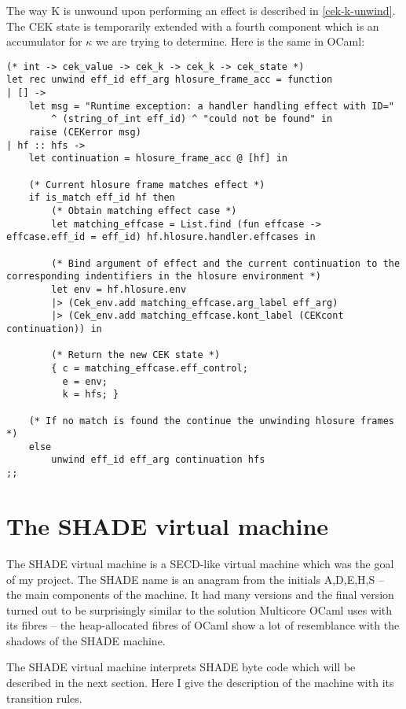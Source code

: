 \documentclass[class=article, crop=false]{standalone}
\begin{document}
The way K is unwound upon performing an effect is described in \autoref{cek-k-unwind}. The CEK state is temporarily extended with a
fourth component which is an accumulator for $\kappa$ we are trying to determine. Here is the same in OCaml:

\begin{lstlisting}[language=caml]
(* int -> cek_value -> cek_k -> cek_k -> cek_state *)
let rec unwind eff_id eff_arg hlosure_frame_acc = function
| [] ->
    let msg = "Runtime exception: a handler handling effect with ID=" 
        ^ (string_of_int eff_id) ^ "could not be found" in
    raise (CEKerror msg)
| hf :: hfs ->
    let continuation = hlosure_frame_acc @ [hf] in
  
    (* Current hlosure frame matches effect *)
    if is_match eff_id hf then
        (* Obtain matching effect case *)
        let matching_effcase = List.find (fun effcase -> effcase.eff_id = eff_id) hf.hlosure.handler.effcases in
        
        (* Bind argument of effect and the current continuation to the corresponding indentifiers in the hlosure environment *)
        let env = hf.hlosure.env
        |> (Cek_env.add matching_effcase.arg_label eff_arg)
        |> (Cek_env.add matching_effcase.kont_label (CEKcont continuation)) in
        
        (* Return the new CEK state *)
        { c = matching_effcase.eff_control;
          e = env;
          k = hfs; }

    (* If no match is found the continue the unwinding hlosure frames *)
    else
        unwind eff_id eff_arg continuation hfs
;;
\end{lstlisting}

\section{The SHADE virtual machine}
\label{sec:shade-machine}

The SHADE virtual machine is a SECD-like virtual machine which was the goal of
my project.
The SHADE name is an anagram from the initials A,D,E,H,S -- the main
components of the machine.
It had many versions and the final version turned out to be surprisingly similar
to the solution Multicore OCaml uses with its fibres -- the heap-allocated fibres
of OCaml show a lot of resemblance with the shadows of the SHADE machine.

The SHADE virtual machine interprets SHADE byte code which will be described
in the next section. Here I give the description of the machine with its transition
rules.
\end{document}
